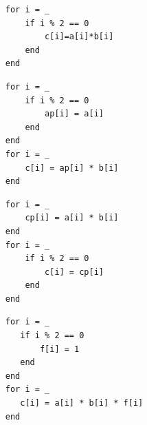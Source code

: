 %
%
%


\begin{minipage}{0.25\linewidth}
\begin{verbatim}
     for i = _
         if i % 2 == 0
             c[i]=a[i]*b[i]
         end
     end
\end{verbatim}
\end{minipage}%
\begin{minipage}{0.25\linewidth}
\begin{verbatim}
     for i = _
         if i % 2 == 0
             ap[i] = a[i]
         end
     end
     for i = _
         c[i] = ap[i] * b[i]
     end
\end{verbatim}
\end{minipage}%
\begin{minipage}{0.25\linewidth}
\begin{verbatim}
     for i = _
         cp[i] = a[i] * b[i]
     end
     for i = _
         if i % 2 == 0
             c[i] = cp[i]
         end
     end
\end{verbatim}
\end{minipage}%
\begin{minipage}{0.25\linewidth}
\begin{verbatim}
     for i = _
        if i % 2 == 0
            f[i] = 1
        end
     end
     for i = _
        c[i] = a[i] * b[i] * f[i]
     end
\end{verbatim}
\end{minipage}%

